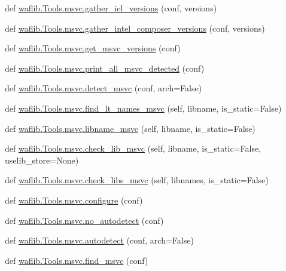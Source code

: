 \begin{DoxyCompactItemize}
\item 
def \hyperlink{namespacewaflib_1_1_tools_1_1msvc_a69c07457130fd493f174ddbbd29eafce}{waflib.\+Tools.\+msvc.\+gather\+\_\+icl\+\_\+versions} (conf, versions)
\item 
def \hyperlink{namespacewaflib_1_1_tools_1_1msvc_a03b2739135f225e530b0272fa62c05de}{waflib.\+Tools.\+msvc.\+gather\+\_\+intel\+\_\+composer\+\_\+versions} (conf, versions)
\item 
def \hyperlink{namespacewaflib_1_1_tools_1_1msvc_a5f32cceb3c4842a224fb09d9d3a1d8f8}{waflib.\+Tools.\+msvc.\+get\+\_\+msvc\+\_\+versions} (conf)
\item 
def \hyperlink{namespacewaflib_1_1_tools_1_1msvc_aae9744b7e465d33a2b06ac41e14aa88e}{waflib.\+Tools.\+msvc.\+print\+\_\+all\+\_\+msvc\+\_\+detected} (conf)
\item 
def \hyperlink{namespacewaflib_1_1_tools_1_1msvc_a7adf5c56dbfc937e2923df5aa71b2087}{waflib.\+Tools.\+msvc.\+detect\+\_\+msvc} (conf, arch=False)
\item 
def \hyperlink{namespacewaflib_1_1_tools_1_1msvc_ad777b6d5d98f37e7a5d020c657d17da8}{waflib.\+Tools.\+msvc.\+find\+\_\+lt\+\_\+names\+\_\+msvc} (self, libname, is\+\_\+static=False)
\item 
def \hyperlink{namespacewaflib_1_1_tools_1_1msvc_a32b62a01e3283caae31fa9d7d8372d0b}{waflib.\+Tools.\+msvc.\+libname\+\_\+msvc} (self, libname, is\+\_\+static=False)
\item 
def \hyperlink{namespacewaflib_1_1_tools_1_1msvc_a714b88608b6a79e74d6393e1b8a1da0f}{waflib.\+Tools.\+msvc.\+check\+\_\+lib\+\_\+msvc} (self, libname, is\+\_\+static=False, uselib\+\_\+store=None)
\item 
def \hyperlink{namespacewaflib_1_1_tools_1_1msvc_af4be6dfee11a1812dd2f458e782afabb}{waflib.\+Tools.\+msvc.\+check\+\_\+libs\+\_\+msvc} (self, libnames, is\+\_\+static=False)
\item 
def \hyperlink{namespacewaflib_1_1_tools_1_1msvc_ae7b47fda406289f0cfa519a383f06a01}{waflib.\+Tools.\+msvc.\+configure} (conf)
\item 
def \hyperlink{namespacewaflib_1_1_tools_1_1msvc_af06d3c92ed056902afe0287918dbbe6d}{waflib.\+Tools.\+msvc.\+no\+\_\+autodetect} (conf)
\item 
def \hyperlink{namespacewaflib_1_1_tools_1_1msvc_a9c695245f349965fd6aacf868589e7bf}{waflib.\+Tools.\+msvc.\+autodetect} (conf, arch=False)
\item 
def \hyperlink{namespacewaflib_1_1_tools_1_1msvc_a8f9c87e3929e466da896514026ec0b6a}{waflib.\+Tools.\+msvc.\+find\+\_\+msvc} (conf)

\end{DoxyCompactItemize}
